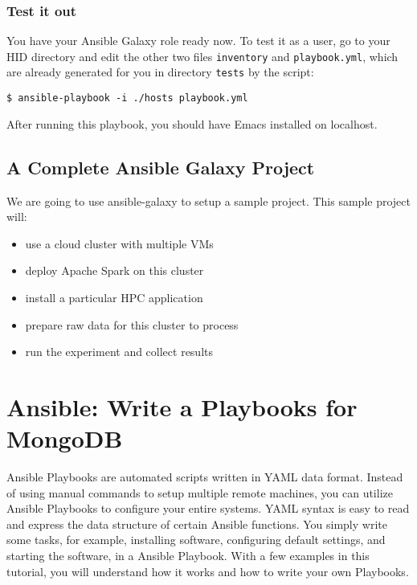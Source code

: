\subsubsection{Test it out}\label{test-it-out}

You have your Ansible Galaxy role ready now. To test it as a user, go to
your HID directory and edit the other two files \texttt{inventory} and
\texttt{playbook.yml}, which are already generated for you in directory
\texttt{tests} by the script:

\begin{verbatim}
$ ansible-playbook -i ./hosts playbook.yml
\end{verbatim}

After running this playbook, you should have Emacs installed on
localhost.

\subsection{A Complete Ansible Galaxy
Project}\label{a-complete-ansible-galaxy-project}

We are going to use ansible-galaxy to setup a sample project. This
sample project will:

\begin{itemize}

\item
  use a cloud cluster with multiple VMs
\item
  deploy Apache Spark on this cluster
\item
  install a particular HPC application
\item
  prepare raw data for this cluster to process
\item
  run the experiment and collect results
\end{itemize}
\section{Ansible: Write a Playbooks for
MongoDB}\label{ansible-write-a-playbooks-for-mongodb}

Ansible Playbooks are automated scripts written in YAML data format.
Instead of using manual commands to setup multiple remote machines, you
can utilize Ansible Playbooks to configure your entire systems. YAML
syntax is easy to read and express the data structure of certain Ansible
functions. You simply write some tasks, for example, installing
software, configuring default settings, and starting the software, in a
Ansible Playbook. With a few examples in this tutorial, you will
understand how it works and how to write your own Playbooks.


